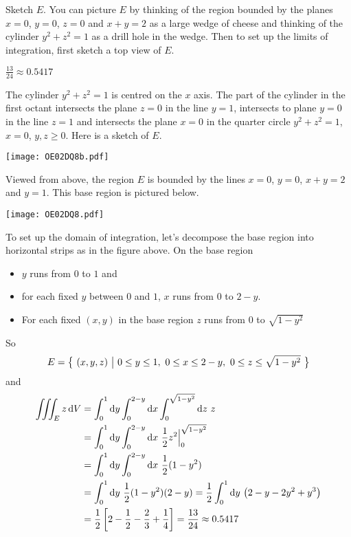 \begin{hint}
Sketch $E$. You can picture $E$ by thinking of the region bounded by the
planes $x=0$, $y=0$, $z=0$ and $x+y=2$ as a large wedge of cheese and thinking
of the cylinder $y^2+z^2=1$ as a drill hole in the wedge. Then to set up
the limits of integration, first sketch a top view of $E$.
\end{hint}

\begin{answer}
$\frac{13}{24}\approx 0.5417$
\end{answer}

\begin{solution}
The cylinder $y^2+z^2=1$ is centred on the $x$ axis. The part of the cylinder
in the first octant intersects the plane $z=0$ in the line $y= 1$,
intersects to plane $y=0$ in the line $z=1$ and intersects the plane
$x=0$ in the quarter circle $y^2+z^2=1$, $x=0$, $y,z\ge 0$. Here is a
sketch of $E$.
\begin{center}
     \texttt{[image: OE02DQ8b.pdf]}
\end{center}
Viewed from above, the region
$E$ is bounded by the lines $x=0$, $y=0$, $x+y=2$ and $y=1$. This base region
is pictured below.
\begin{center}
     \texttt{[image: OE02DQ8.pdf]}
\end{center}
To set up the domain of integration, let's decompose the base region into
horizontal strips as in the figure above. On the base region
\begin{itemize}
\item 
   $y$ runs from $0$ to $1$ and
\item 
   for each fixed $y$ between $0$ and $1$, $x$ runs from $0$ to $2-y$.
\item
   For each fixed $(x,y)$ in the base region $z$ runs from $0$ 
   to $\sqrt{1-y^2}$
\end{itemize}
So
\begin{equation*}
E=\big\{ \ (x,y,z)\ \big|\ 0\le y\le 1,\ 0\le x\le 2-y,\ 0\le z\le\sqrt{1-y^2} \ \big\}
\end{equation*}
and
\begin{align*}
\iiint_E z\,\mathrm{d}V&=\int_0^1 \mathrm{d}y\int_0^{2-y}\mathrm{d}x\int_0^{\sqrt{1-y^2}}\mathrm{d}z\ z\\
&=\int_0^1 \mathrm{d}y\int_0^{2-y}\mathrm{d}x\ \frac{1}{2} z^2\Big|_0^{\sqrt{1-y^2}} \\
&=\int_0^1 \mathrm{d}y\int_0^{2-y}\mathrm{d}x\ \frac{1}{2} (1-y^2) \\
&=\int_0^1 \mathrm{d}y\ \frac{1}{2} (1-y^2)(2-y)
=\frac{1}{2}\int_0^1 \mathrm{d}y\ \big(2-y-2y^2+y^3\big) \\
&=\frac{1}{2}\left[2-\frac{1}{2}-\frac{2}{3}+\frac{1}{4}\right]
=\frac{13}{24}\approx 0.5417
\end{align*}
\end{solution}

